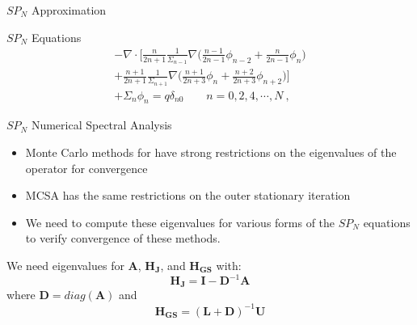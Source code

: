 \documentclass{beamer}
\begin{document}
\begin{frame}{$SP_N$ Approximation}

  \begin{beamerboxesrounded}[upper=boxheadcolor,lower=boxbodycolor,shadow=true]
    {$SP_N$ Equations}
    \begin{multline}
      -\nabla \cdot \Bigg[\frac{n}{2n+1}\frac{1}{\Sigma_{n-1}} \nabla
        \Big(\frac{n-1}{2n-1} \phi_{n-2} + \frac{n}{2n-1}\phi_n \Big)
        \\+ \frac{n+1}{2n+1}\frac{1}{\Sigma_{n+1}} \nabla
        \Big(\frac{n+1}{2n+3}\phi_n + \frac{n+2}{2n+3}\phi_{n+2}\Big)
        \Bigg] \\+ \Sigma_n \phi_n = q \delta_{n0}\ \ \ \ \ \ \ \ \ n
      = 0,2,4,\cdots,N\:,
      \label{eq:spn_equations}
    \end{multline}
  \end{beamerboxesrounded}

\end{frame}

\begin{frame}{$SP_N$ Numerical Spectral Analysis}

  \begin{itemize}
    \item Monte Carlo methods for have strong restrictions on the
      eigenvalues of the operator for convergence
    \item MCSA has the same restrictions on the outer stationary
      iteration
    \item We need to compute these eigenvalues for various forms of
      the $SP_N$ equations to verify convergence of these methods.
  \end{itemize}

  We need eigenvalues for $\mathbf{A}$, $\mathbf{H_{J}}$, and
  $\mathbf{H_{GS}}$ with:
  \begin{equation}
    \mathbf{H_{J}} = \mathbf{I} - \mathbf{D}^{-1} \mathbf{A}
    \label{eq:jacobi_iteration_matrix}
  \end{equation}
  where $\mathbf{D} = diag(\mathbf{A})$ and 
  \begin{equation}
    \mathbf{H_{GS}} = (\mathbf{L+D})^{-1}\mathbf{U}
    \label{eq:gauss_seidel_iteration_matrix}
  \end{equation}

\end{frame}
\end{document}
